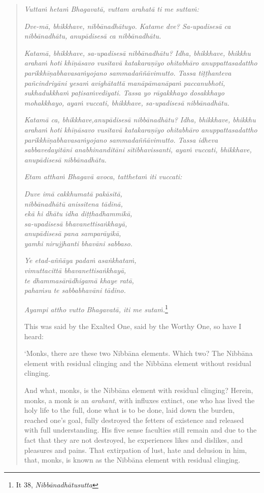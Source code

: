 \begin{quote}
\emph{Vuttaṁ hetaṁ Bhagavatā, vuttam arahatā ti me suttaṁ:}

\emph{Dve-mā, bhikkhave, nibbānadhātuyo. Katame dve? Sa-upadisesā ca nibbānadhātu, anupādisesā ca nibbānadhātu.}

\emph{Katamā, bhikkhave, sa-upadisesā nibbānadhātu? Idha, bhikkhave, bhikkhu arahaṁ hoti khīṇāsavo vusitavā katakaraṇīyo ohitabhāro anuppattasadattho parikkhīṇabhavasaṁyojano sammadaññāvimutto. Tassa tiṭṭhanteva pañcindriyāni yesaṁ avighātattā manāpāmanāpaṁ paccanubhoti, sukhadukkhaṁ paṭisaṁvediyati. Tassa yo rāgakkhayo dosakkhayo mohakkhayo, ayaṁ vuccati, bhikkhave, sa-upadisesā nibbānadhātu.}

\emph{Katamā ca, bhikkhave,anupādisesā nibbānadhātu? Idha, bhikkhave, bhikkhu arahaṁ hoti khīṇāsavo vusitavā katakaraṇīyo ohitabhāro anuppattasadattho parikkhīṇabhavasaṁyojano sammadaññāvimutto. Tassa idheva sabbavedayitāni anabhinanditāni sītibhavissanti, ayaṁ vuccati, bhikkhave, anupādisesā nibbānadhātu.}

\emph{Etam atthaṁ Bhagavā avoca, tatthetaṁ iti vuccati:}

\emph{Duve imā cakkhumatā pakāsitā,}\\
\emph{nibbānadhātū anissitena tādinā,}\\
\emph{ekā hi dhātu idha diṭṭhadhammikā,}\\
\emph{sa-upadisesā bhavanettisaṅkhayā,}\\
\emph{anupādisesā pana samparāyikā,}\\
\emph{yamhi nirujjhanti bhavāni sabbaso.}

\emph{Ye etad-aññāya padaṁ asaṅkhataṁ,}\\
\emph{vimuttacittā bhavanettisaṅkhayā,}\\
\emph{te dhammasārādhigamā khaye ratā,}\\
\emph{pahaṁsu te sabbabhavāni tādino.}

\emph{Ayampi attho vutto Bhagavatā, iti me sutaṁ.}\footnote{It 38, \emph{Nibbānadhātusutta}}

This was said by the Exalted One, said by the Worthy One, so have I heard:

`Monks, there are these two Nibbāna elements. Which two? The Nibbāna element with residual clinging and the Nibbāna element without residual clinging.

And what, monks, is the Nibbāna element with residual clinging? Herein, monks, a monk is an \emph{arahant}, with influxes extinct, one who has lived the holy life to the full, done what is to be done, laid down the burden, reached one's goal, fully destroyed the fetters of existence and released with full understanding. His five sense faculties still remain and due to the fact that they are not destroyed, he experiences likes and dislikes, and pleasures and pains. That extirpation of lust, hate and delusion in him, that, monks, is known as the Nibbāna element with residual clinging.


\end{quote}
